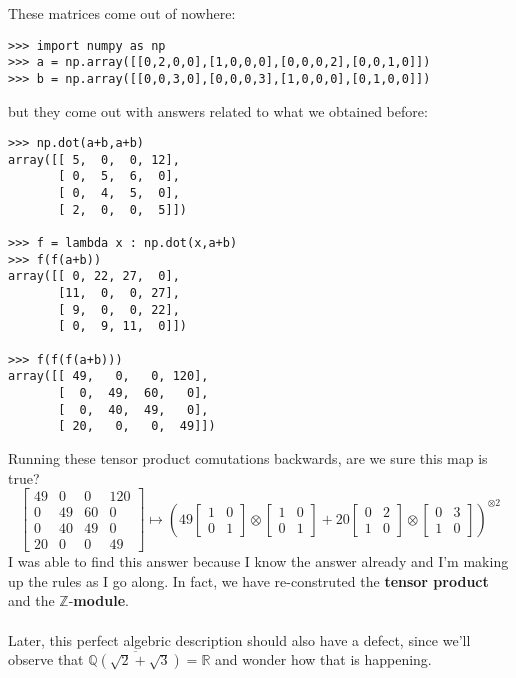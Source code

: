 \documentclass[12pt]{article}
\begin{document}
\noindent These matrices come out of nowhere:
\begin{verbatim}
>>> import numpy as np
>>> a = np.array([[0,2,0,0],[1,0,0,0],[0,0,0,2],[0,0,1,0]])
>>> b = np.array([[0,0,3,0],[0,0,0,3],[1,0,0,0],[0,1,0,0]])
\end{verbatim}
but they come out with answers related to what we obtained before:
\begin{verbatim}
>>> np.dot(a+b,a+b)
array([[ 5,  0,  0, 12],
       [ 0,  5,  6,  0],
       [ 0,  4,  5,  0],
       [ 2,  0,  0,  5]])

>>> f = lambda x : np.dot(x,a+b)
>>> f(f(a+b))
array([[ 0, 22, 27,  0],
       [11,  0,  0, 27],
       [ 9,  0,  0, 22],
       [ 0,  9, 11,  0]])
       
>>> f(f(f(a+b)))
array([[ 49,   0,   0, 120],
       [  0,  49,  60,   0],
       [  0,  40,  49,   0],
       [ 20,   0,   0,  49]])
\end{verbatim}
Running these tensor product comutations backwards, are we sure this map is true?
$$ \left[
\begin{array}{cc|cc} 
        49&   0&   0& 120\\
         0&  49&  60&   0\\ \hline
         0&  40&  49&   0\\
        20&   0&   0&  49 \end{array}\right]
\mapsto 
\left( 
49\left[\begin{array}{cc} 1 & 0 \\ 0 & 1\end{array} \right] \otimes \left[\begin{array}{cc} 1 & 0 \\ 0 & 1\end{array} \right]
+
20 \left[\begin{array}{cc} 0 & 2 \\ 1 & 0 \end{array} \right] \otimes \left[\begin{array}{cc} 0 & 3 \\ 1 & 0\end{array} \right]
 \right)^{\otimes 2}
$$
I was able to find this answer because I know the answer already and I'm making up the rules as I go along.  In fact, we have re-construted the \textbf{tensor product} and the $\mathbb{Z}$-\textbf{module}. \\ \\
Later, this perfect algebric description should also have a defect, since we'll observe that $\overline{\mathbb{Q}(\sqrt{2}+\sqrt{3})} = \mathbb{R}$ and wonder how that is happening.
\end{document}
